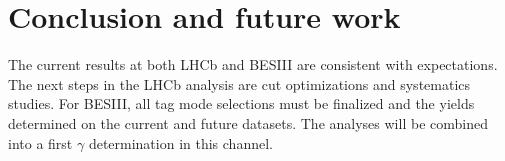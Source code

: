 \documentclass[12pt, a4paper, notitlepage, onecolumn]{article}
\begin{document}
\section{Conclusion and future work}
\noindent The current results at both LHCb and BESIII are consistent with expectations. The next steps in the LHCb analysis are cut optimizations and systematics studies. For BESIII, all tag mode selections must be finalized and the yields determined on the current and future datasets. The analyses will be combined into a first $\gamma$ determination in this channel.




\newpage
\end{document}
